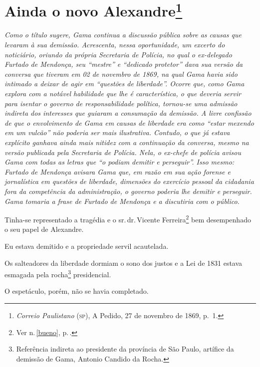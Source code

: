 \chapter{Ainda o novo Alexandre\footnote{\emph{Correio Paulistano}
  (\textsc{sp}), A Pedido, 27 de novembro de 1869, p.~1.}}

\begin{didascalia}\itshape
Como o título sugere, Gama continua a discussão pública sobre as causas
que levaram à sua demissão. Acrescenta, nessa oportunidade, um excerto
do noticiário, oriundo da própria Secretaria de Polícia, no qual o
ex-delegado Furtado de Mendonça, seu ``mestre'' e ``dedicado protetor'' dava
sua versão da conversa que tiveram em 02 de novembro de 1869, na qual Gama havia
sido intimado a deixar de agir em ``questões de liberdade''. Ocorre que,
como Gama explora com a notável habilidade que lhe é característica, o
que deveria servir para isentar o governo de responsabilidade política,
tornou-se uma admissão indireta dos interesses que guiaram a consumação
da demissão. A livre confissão de que o envolvimento de Gama em causas
de liberdade era como ``estar mexendo em um vulcão'' não poderia ser mais
ilustrativa. Contudo, o que já estava explícito ganhava ainda mais
nitidez com a continuação da conversa, mesmo na versão publicada pela
Secretaria de Polícia. Nela, o ex-chefe de polícia avisou Gama com todas
as letras que ``o podiam demitir e perseguir''. Isso mesmo: Furtado de
Mendonça avisara Gama que, em razão em sua ação forense e jornalística
em questões de liberdade, dimensões do exercício pessoal da cidadania
fora da competência da administração, o governo poderia lhe demitir e
perseguir. Gama tomaria a frase de Furtado de Mendonça e a discutiria
com o público.
\end{didascalia}



Tinha-se representado a tragédia e o sr.\,dr.\,Vicente Ferreira\footnote{Ver n.\,\ref{bueno}, p.\,\pageref{bueno}.} bem desempenhado o seu
papel de Alexandre.

Eu estava demitido e a propriedade servil acautelada.

Os salteadores da liberdade dormiam o sono dos justos e a Lei de 1831
estava esmagada pela rocha\footnote{Referência indireta ao presidente
  da província de São Paulo, artífice da demissão de Gama, Antonio
  Candido da Rocha.} presidencial.

O espetáculo, porém, não se havia completado.

